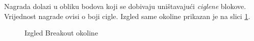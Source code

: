 Nagrada dolazi u obliku bodova koji se dobivaju uništavajući \textit{ciglene} blokove. Vrijednost nagrade ovisi o boji cigle. Izgled same okoline prikazan je na slici \ref{fig:breakout}.

\begin{figure}[H]
    \centering
    \caption{Izgled Breakout okoline}
    \label{fig:breakout}
\end{figure}






